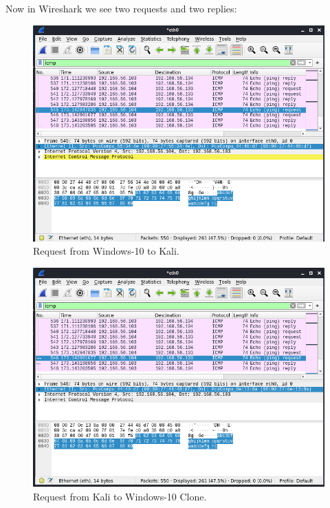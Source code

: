 Now in Wireshark we see two requests and two replies:
\begin{figure}[H]
    \centering
    \includegraphics[width=\linewidth]{figures/request1.png}
    \caption{Request from Windows-10 to Kali.}
    \label{fig:request1}
\end{figure}
\begin{figure}[H]
    \centering
    \includegraphics[width=\linewidth]{figures/request2.png}
    \caption{Request from Kali to Windows-10 Clone.}
    \label{fig:request2}
\end{figure}
